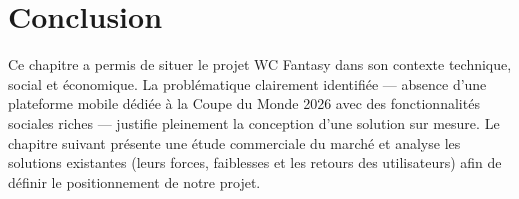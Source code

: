\section*{Conclusion}

Ce chapitre a permis de situer le projet WC Fantasy dans son contexte technique, social et économique. La problématique clairement identifiée — absence d'une plateforme mobile dédiée à la Coupe du Monde 2026 avec des fonctionnalités sociales riches — justifie pleinement la conception d'une solution sur mesure. Le chapitre suivant présente une étude commerciale du marché et analyse les solutions existantes (leurs forces, faiblesses et les retours des utilisateurs) afin de définir le positionnement de notre projet.
